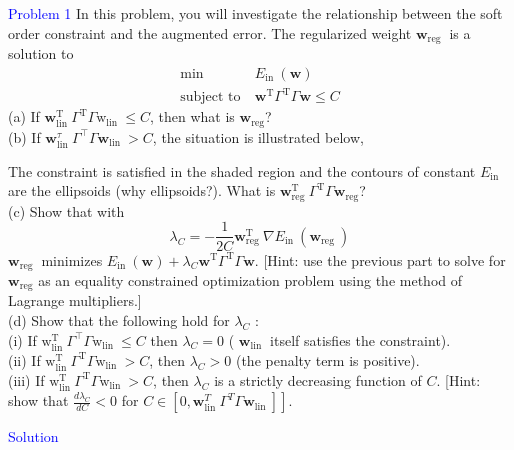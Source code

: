 \textcolor{blue}{Problem 1}
In this problem, you will investigate the relationship between the soft order constraint and the augmented error. The regularized weight $\mathbf{w}_{\text {reg }}$ is a solution to
\begin{align*}
\min &\ E_{\text {in }}(\mathbf{w}) \\
\text {subject to} &\ \mathbf{w}^{\mathrm{T}} \Gamma^{\mathrm{T}} \Gamma \mathbf{w} \leq C
\end{align*}
(a) If $\mathbf{w}_{\text {lin }}^{\mathrm{T}} \Gamma^{\mathrm{T}} \Gamma \mathrm{w}_{\text {lin }} \leq C$, then what is $\mathbf{w}_{\text{reg}}$?\\
(b) If $\mathbf{w}_{\text {lin }}^\tau \Gamma^{\top} \Gamma \mathbf{w}_{\text {lin }}>C$, the situation is illustrated below,

The constraint is satisfied in the shaded region and the contours of constant $E_{\text {in }}$ are the ellipsoids (why ellipsoids?). What is $\mathbf{w}_{\text {reg }}^{\mathrm{T}} \Gamma^{\mathrm{T}} \Gamma \mathbf{w}_{\mathrm{reg}}$?\\
(c) Show that with
$$
\lambda_C=-\frac{1}{2 C} \mathbf{w}_{\text {reg }}^{\mathrm{T}} \nabla E_{\text {in }}\left(\mathbf{w}_{\text {reg }}\right)
$$
$\mathbf{w}_{\text {reg }}$ minimizes $E_{\text {in }}(\mathbf{w})+\lambda_C \mathbf{w}^{\mathrm{T}} \Gamma^{\mathrm{T}} \Gamma \mathbf{w}$. [Hint: use the previous part to solve for $\mathbf{w}_{\text{reg}}$ as an equality constrained optimization problem using the method of Lagrange multipliers.]\\
(d) Show that the following hold for $\lambda_C$ :\\
(i) If $\mathrm{w}_{\text {lin }}^{\mathrm{T}} \Gamma^{\top} \Gamma \mathrm{w}_{\text {lin }} \leq C$ then $\lambda_C=0$ ( $\mathbf{w}_{\text {lin }}$ itself satisfies the constraint).\\
(ii) If $\mathrm{w}_{\text {lin }}^{\mathrm{T}} \Gamma^{\mathrm{T}} \Gamma \mathrm{w}_{\text {lin }}>C$, then $\lambda_C>0$ (the penalty term is positive).\\
(iii) If $\mathrm{w}_{\text {lin }}^{\mathrm{T}} \Gamma^{\mathrm{T}} \Gamma \mathrm{w}_{\text {lin }}>C$, then $\lambda_C$ is a strictly decreasing function of $C$. [Hint: show that $\frac{d \lambda_C}{d C}<0$ for $\left.C \in\left[0, \mathbf{w}_{\text {lin }}^T \Gamma^T \Gamma \mathbf{w}_{\text {lin }}\right]\right]$.

\textcolor{blue}{Solution}\\















\newpage